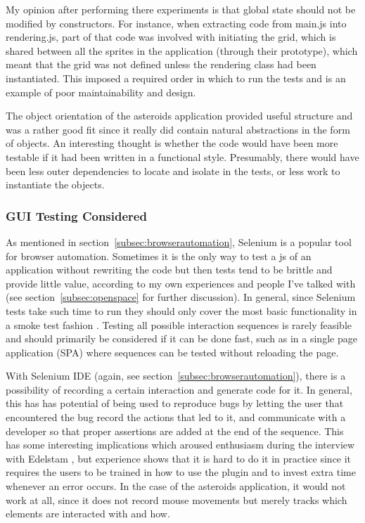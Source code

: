 \documentclass[11pt]{article}
\begin{document}
My opinion after performing there experiments is that global state should not be modified by constructors. For instance, when extracting code from main.js into rendering.js, part of that code was involved with initiating the grid, which is shared between all the sprites in the application (through their prototype), which meant that the grid was not defined unless the rendering class had been instantiated. This imposed a required order in which to run the tests and is an example of poor maintainability and design.

The object orientation of the asteroids application provided useful structure and was a rather good fit since it really did contain natural abstractions in the form of objects. An interesting thought is whether the code would have been more testable if it had been written in a functional style. Presumably, there would have been less outer dependencies to locate and isolate in the tests, or less work to instantiate the objects. \cite[question~26]{Ahnve}

\subsubsection{GUI Testing Considered}
\label{subsec:asteroids}

As mentioned in section~\ref{subsec:browserautomation}, Selenium is a popular tool for browser automation. Sometimes it is the only way to test a \gls{js} of an application without rewriting the code \cite[question~43]{Stenmark} but then tests tend to be brittle and provide little value, according to my own experiences and people I've talked with (see section~\ref{subsec:openspace} for further discussion). In general, since Selenium tests take such time to run they should only cover the most basic functionality in a smoke test fashion \cite[questions~16-17]{Stenmark}\cite[question~21]{Ahnve}. Testing all possible interaction sequences is rarely feasible and should primarily be considered if it can be done fast, such as in a single page application (SPA) where sequences can be tested without reloading the page. \cite[question~44]{Edelstam}

With Selenium IDE (again, see section~\ref{subsec:browserautomation}), there is a possibility of recording a certain interaction and generate code for it. In general, this has has potential of being used to reproduce bugs by letting the user that encountered the bug record the actions that led to it, and communicate with a developer so that proper assertions are added at the end of the sequence. This has some interesting implications which aroused enthusiasm during the interview with Edelstam \cite[questions~42-43]{Edelstam}, but experience shows that it is hard to do it in practice since it requires the users to be trained in how to use the plugin and to invest extra time whenever an error occurs. In the case of the asteroids application, it would not work at all, since it does not record mouse movements but merely tracks which elements are interacted with and how.
\end{document}
